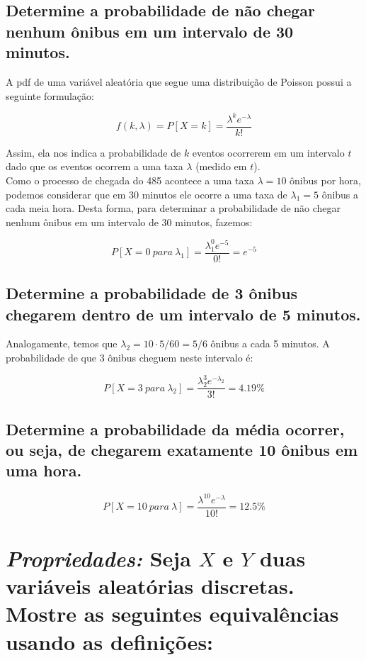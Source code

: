 \documentclass[a4paper]{article}
\begin{document}
\subsection{Determine a probabilidade de não chegar nenhum ônibus em um intervalo de 30 minutos.}

A pdf de uma variável aleatória que segue uma distribuição de Poisson possui a seguinte formulação: 

$$f(k, \lambda) = P[X = k] = \frac{\lambda^ke^{-\lambda}}{k!}$$

Assim, ela nos indica a probabilidade de $k$ eventos ocorrerem em um intervalo $t$ dado que os eventos ocorrem a uma taxa $\lambda$ (medido em $t$). \\

Como o processo de chegada do 485 acontece a uma taxa $\lambda = 10$ ônibus por hora, podemos considerar que em 30 minutos ele ocorre a uma taxa de $\lambda_1 = 5$ ônibus a cada meia hora. Desta forma,  para determinar a probabilidade de não chegar nenhum ônibus em um intervalo de 30 minutos, fazemos: 

$$P[X = 0\ para\ \lambda_1] = \frac{\lambda_1^0e^{-5}}{0!} = e^{-5}$$

\subsection{Determine a probabilidade de 3 ônibus chegarem dentro de um intervalo de 5 minutos.}

Analogamente, temos que $\lambda_2 = 10\cdot 5 / 60 = 5/6$ ônibus a cada 5 minutos. A probabilidade de que 3 ônibus cheguem neste intervalo é: 

$$P[X = 3\ para\ \lambda_2] = \frac{\lambda_2^3e^{-\lambda_2}}{3!} =4.19\%$$


\subsection{Determine a probabilidade da média ocorrer, ou seja, de chegarem exatamente 10 ônibus em uma hora.}

$$P[X = 10\ para\ \lambda] = \frac{\lambda^{10}e^{-\lambda}}{10!} = 12.5\%$$


\section{\textit{Propriedades:} Seja $X$ e $Y$ duas variáveis aleatórias discretas. Mostre as seguintes equivalências usando as definições:}
\end{document}
